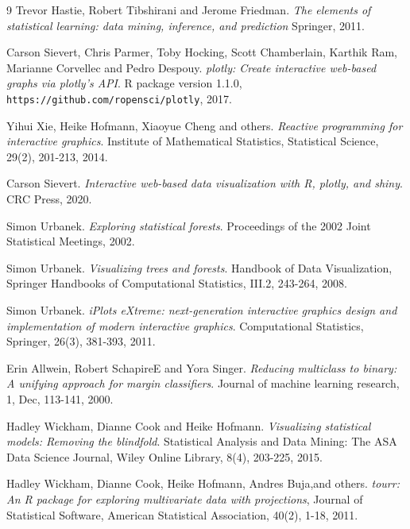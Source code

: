 \documentclass[10pt, legalpaper, twoside]{article}\usepackage[]{graphicx}\usepackage[]{color}
\begin{document}
\begin{thebibliography}{9}
Trevor Hastie, Robert Tibshirani and Jerome Friedman.
\textit{The elements of statistical learning: data mining, inference, and prediction}
Springer, 2011.



Carson Sievert, Chris Parmer, Toby Hocking, Scott Chamberlain, Karthik Ram, Marianne Corvellec and Pedro Despouy.
\textit{plotly: Create interactive web-based graphs via plotly's API}.
R package version 1.1.0,
\\\texttt{https://github.com/ropensci/plotly}, 2017.

Yihui Xie, Heike Hofmann, Xiaoyue Cheng and others.
\textit{Reactive programming for interactive graphics}.
Institute of Mathematical Statistics, Statistical Science,
29(2), 201-213, 2014.


Carson Sievert.
\textit{Interactive web-based data visualization with R, plotly, and shiny}.
CRC Press, 2020. 

Simon Urbanek.
 \textit{Exploring statistical forests}.
Proceedings of the 2002 Joint Statistical Meetings,
2002.

Simon Urbanek.
\textit{Visualizing trees and forests}.
Handbook of Data Visualization, Springer Handbooks of Computational Statistics, III.2, 243-264, 2008.

Simon Urbanek.
\textit{iPlots eXtreme: next-generation interactive graphics design and implementation of modern interactive graphics}.
Computational Statistics, Springer, 26(3), 381-393, 2011.

Erin Allwein, Robert SchapireE and Yora Singer.
\textit{Reducing multiclass to binary: A unifying approach for margin classifiers}.
Journal of machine learning research, 1,
Dec, 113-141, 2000.


Hadley Wickham, Dianne Cook and Heike Hofmann.
 \textit{Visualizing statistical models: Removing the blindfold}.
Statistical Analysis and Data Mining: The ASA Data Science Journal,
Wiley Online Library, 8(4), 203-225, 2015.


Hadley Wickham, Dianne Cook, Heike Hofmann, Andres Buja,and others.
\textit{tourr: An R package for exploring multivariate data with projections},
Journal of Statistical Software, American Statistical Association,
40(2), 1-18, 2011.



\end{thebibliography}
\end{document}
